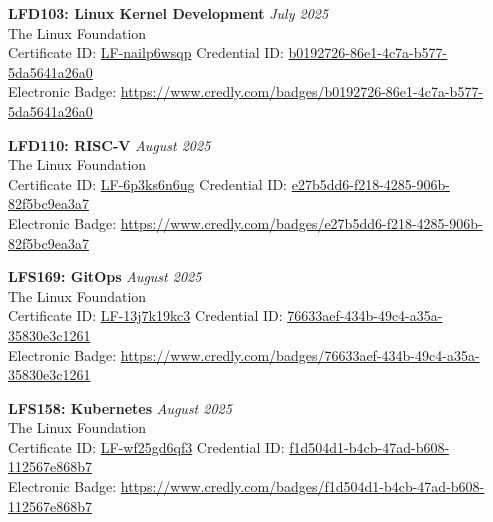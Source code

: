 \documentclass[a4paper,10pt]{article}
\begin{document}
\textbf{LFD103: Linux Kernel Development} \hfill \textit{July 2025} \\
The Linux Foundation\\
Certificate ID:  \url{LF-nailp6wsqp} \hfill Credential ID:  \url{b0192726-86e1-4c7a-b577-5da5641a26a0}\\
Electronic Badge:  \url{https://www.credly.com/badges/b0192726-86e1-4c7a-b577-5da5641a26a0}
\noindent

\textbf{LFD110: RISC-V} \hfill \textit{August 2025} \\
The Linux Foundation\\
Certificate ID:  \url{LF-6p3ks6n6ug} \hfill Credential ID: \url{e27b5dd6-f218-4285-906b-82f5bc9ea3a7}\\
Electronic Badge:  \url{https://www.credly.com/badges/e27b5dd6-f218-4285-906b-82f5bc9ea3a7}
\noindent

\textbf{LFS169: GitOps} \hfill \textit{August 2025} \\
The Linux Foundation\\
Certificate ID:	 \url{LF-13j7k19kc3} \hfill Credential ID: 	\url{76633aef-434b-49c4-a35a-35830e3c1261}\\
Electronic Badge:  \url{https://www.credly.com/badges/76633aef-434b-49c4-a35a-35830e3c1261}
\noindent

\textbf{LFS158: Kubernetes} \hfill \textit{August 2025} \\
The Linux Foundation\\
Certificate ID: \url{LF-wf25gd6qf3} \hfill Credential ID: \url{f1d504d1-b4cb-47ad-b608-112567e868b7}\\
Electronic Badge: \url{https://www.credly.com/badges/f1d504d1-b4cb-47ad-b608-112567e868b7}
\noindent
\end{document}
